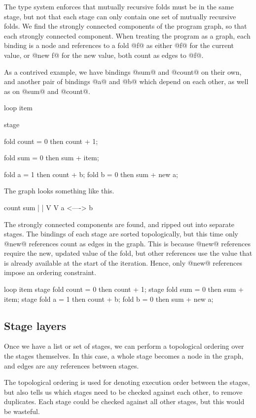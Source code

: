 The type system enforces that mutually recursive folds must be in the same stage, but not that each stage can only contain one set of mutually recursive folds.
We find the strongly connected components of the program graph, so that each strongly connected component.
When treating the program as a graph, each binding is a node and references to a fold @f@ as either @f@ for the current value, or @new f@ for the new value, both count as edges to @f@.

As a contrived example, we have bindings @sum@ and @count@ on their own, and another pair of bindings @a@ and @b@ which depend on each other, as well as on @sum@ and @count@.
\begin{code}
loop item {
  stage {
    fold count = 0 then count + 1;

    fold sum   = 0 then sum   + item;

    fold a     = 1 then count + b;
    fold b     = 0 then sum + new a;
  }
}
\end{code}

The graph looks something like this.
\begin{code}
  count     sum
    |        |
    V        V
    a <----> b
\end{code}

The strongly connected components are found, and ripped out into separate stages.
The bindings of each stage are sorted topologically, but this time only @new@ references count as edges in the graph.
This is because @new@ references require the new, updated value of the fold, but other references use the value that is already available at the start of the iteration.
Hence, only @new@ references impose an ordering constraint.
\begin{code}
loop item {
  stage {
    fold count = 0 then count + 1;
  }
  stage {
    fold sum   = 0 then sum   + item;
  }
  stage {
    fold a     = 1 then count + b;
    fold b     = 0 then sum + new a;
  }
}
\end{code}

\subsection{Stage layers}
Once we have a list or set of stages, we can perform a topological ordering over the stages themselves.
In this case, a whole stage becomes a node in the graph, and edges are any references between stages.

The topological ordering is used for denoting execution order between the stages, but also tells us which stages need to be checked against each other, to remove duplicates.
Each stage could be checked against all other stages, but this would be wasteful.

